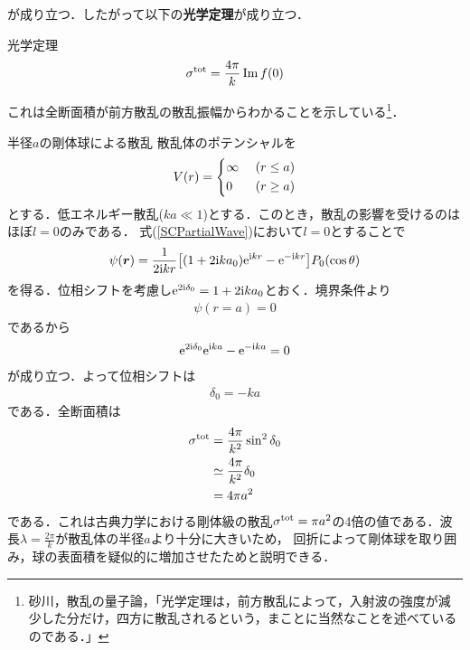 \documentclass{report}
\begin{document}
  が成り立つ．したがって以下の\textbf{光学定理}が成り立つ．
  \begin{itembox}[l]{光学定理}
    \begin{align}
      \sigma^{\mathrm{tot}} = \frac{4\pi}{k} \Im f(0)
    \end{align}
  \end{itembox}
  これは全断面積が前方散乱の散乱振幅からわかることを示している\footnote{
   砂川，散乱の量子論，「光学定理は，前方散乱によって，入射波の強度が減少した分だけ，四方に散乱されるという，まことに当然なことを述べているのである．」 
  }．
  \begin{myex}{半径$a$の剛体球による散乱}{}
    散乱体のポテンシャルを
    \begin{align}
      V(r) =
      \begin{dcases}
         \infty\ &(r \leq a)\\
        0\ &(r \geq a)
      \end{dcases}
    \end{align}
    とする．低エネルギー散乱($ka \ll 1$)とする．このとき，散乱の影響を受けるのはほぼ$l=0$のみである．
    式(\ref{SCPartialWave})において$l=0$とすることで
    \begin{align}
      \psi(\bm{r}) = \frac{1}{2\mathrm{i} kr}\qty[(1 + 2\mathrm{i} k a_0)\mathrm{e}^{\mathrm{i} kr} - \mathrm{e}^{-\mathrm{i} kr}] P_0(\cos\theta)
    \end{align}
    を得る．位相シフトを考慮し$\mathrm{e}^{2\mathrm{i} \delta_0} = 1 + 2\mathrm{i} ka_0$とおく．境界条件より
    \begin{align}
      \psi(r=a) = 0
    \end{align}
    であるから
    \begin{align}
      \mathrm{e}^{2\mathrm{i} \delta_0}\mathrm{e}^{\mathrm{i} ka} - \mathrm{e}^{-\mathrm{i} ka} = 0
    \end{align}
    が成り立つ．よって位相シフトは
    \begin{align}
      \delta_0 = -ka
    \end{align}
    である．全断面積は
    \begin{align}
      \sigma^{\mathrm{tot}} &= \frac{4\pi}{k^2}\sin^2\delta_0\\
      &\simeq \frac{4\pi}{k^2}\delta_0\\
      &= 4\pi a^2
    \end{align}
    である．これは古典力学における剛体級の散乱$\sigma^{\mathrm{tot}}=\pi a^2$の4倍の値である．波長$\lambda=\frac{2\pi}{k}$が散乱体の半径$a$より十分に大きいため，
    回折によって剛体球を取り囲み，球の表面積を疑似的に増加させたためと説明できる．
  \end{myex}
\end{document}
